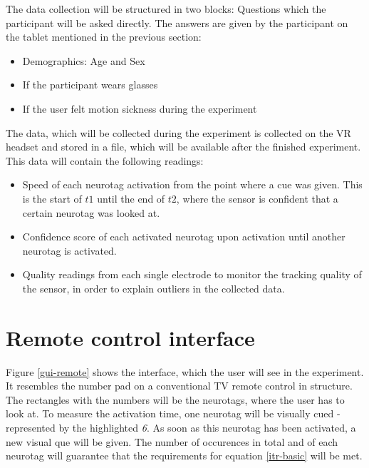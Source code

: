             The data collection will be structured in two blocks: Questions which the participant will be asked directly. The answers are given by the participant on the tablet mentioned in the previous section:

            \begin{itemize}
                \item Demographics: Age and Sex
                \item If the participant wears glasses
                \item If the user felt motion sickness during the experiment
            \end{itemize}

            The data, which will be collected during the experiment is collected on the VR headset and stored in a file, which will be available after the finished experiment. This data will contain the following readings:

            \begin{itemize}
                \item Speed of each neurotag activation from the point where a cue was given. This is the start of $t1$ until the end of $t2$, where the sensor is confident that a certain neurotag was looked at.
                \item Confidence score of each activated neurotag upon activation until another neurotag is activated.
                \item Quality readings from each single electrode to monitor the tracking quality of the sensor, in order to explain outliers in the collected data.
            \end{itemize}

        \section{Remote control interface}
            
            Figure \ref*{gui-remote} shows the interface, which the user will see in the experiment. It resembles the number pad on a conventional TV remote control in structure. The rectangles with the numbers will be the neurotags, where the user has to look at. To measure the activation time, one neurotag will be visually cued - represented by the highlighted \textit{6}. As soon as this neurotag has been activated, a new visual que will be given. The number of occurences in total and of each neurotag will guarantee that the requirements for equation \ref*{itr-basic} will be met.

